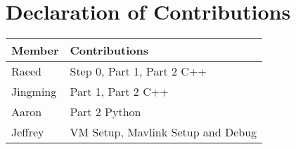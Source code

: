 \section*{Declaration of Contributions}
\begin{table}[htp]
\centering
\begin{tabular}{|l|l|}
\hline
    Member      & Contributions                     \\ \hline
    Raeed       & Step 0, Part 1, Part 2 C++        \\ \hline
    Jingming    & Part 1, Part 2 C++                \\ \hline
    Aaron       & Part 2 Python                     \\ \hline
    Jeffrey     & VM Setup, Mavlink Setup and Debug \\ \hline
\end{tabular}
\end{table}